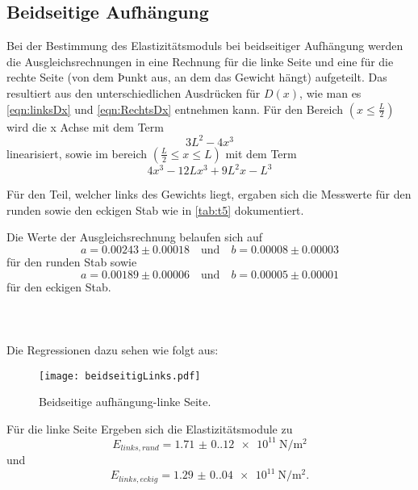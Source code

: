 \subsection{Beidseitige Aufhängung}
Bei der Bestimmung des Elastizitätsmoduls bei beidseitiger Aufhängung werden
die Ausgleichsrechnungen in eine Rechnung für die linke Seite und eine für
die rechte Seite (von dem Þunkt aus, an dem das Gewicht hängt) aufgeteilt.
Das resultiert aus den unterschiedlichen Ausdrücken für $D(x)$, wie man es
\autoref{eqn:linksDx} und \autoref{eqn:RechtsDx} entnehmen kann.
Für den Bereich $(x\leq\frac{L}{2})$ wird die x Achse mit dem Term
\begin{equation*}
    3L^2-4x^3
\end{equation*}
linearisiert, sowie im bereich $(\frac{L}{2}\leq x \leq L)$ mit dem Term
\begin{equation}
  4x^3-12Lx^3+9L^2x-L^3
\end{equation}

\noindent Für den Teil, welcher links des Gewichts liegt, ergaben sich die 
Messwerte für den runden sowie den eckigen Stab wie in \autoref{tab:t5} 
dokumentiert.

\noindent Die Werte der Ausgleichsrechnung belaufen sich auf 
\begin{equation*}
  a = 0.00243 \pm 0.00018 \quad \text{und} \quad b = 0.00008 \pm 0.00003
\end{equation*}
für den runden Stab sowie
\begin{equation*}
  a = 0.00189 \pm 0.00006 \quad \text{und} \quad b = 0.00005 \pm 0.00001
\end{equation*}
für den eckigen Stab.
\\
\\
\\
\\
\noindent Die Regressionen dazu sehen wie folgt aus:
\begin{figure}[H]
  \centering
  \texttt{[image: beidseitigLinks.pdf]}
  \caption{Beidseitige aufhängung-linke Seite.}
  \label{fig:linksBeidseitig}
\end{figure}
Für die linke Seite Ergeben sich die Elastizitätsmodule zu 
\begin{equation*}
  E_{links,rund} = \qty{1.71(0.12)e11}{\newton\per\meter\squared}
\end{equation*}
und
\begin{equation*}
  E_{links,eckig} = \qty{1.29(0.04)e11}{\newton\per\meter\squared}.
\end{equation*}


